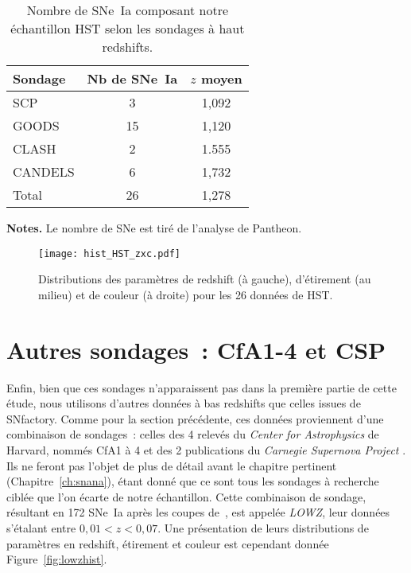 \documentclass[../main/main.tex]{subfiles}
\begin{document}
\begin{table}[]
    \centering
    \begin{threeparttable}
        \caption[Nombre de SNe~Ia de notre échantillon HST selon la
        source]{Nombre de SNe~Ia composant notre échantillon HST selon les
        sondages à haut redshifts.}
        \label{tab:hstcuts}
        \begin{tabular}{lcc}
            \toprule
            Sondage & Nb de SNe~Ia & $z$ moyen \\
            \midrule
            SCP     & 3            & 1,092 \\
            GOODS   & 15           & 1,120 \\
            CLASH   & 2            & 1.555 \\
            CANDELS & 6            & 1,732 \\
            \midrule
            Total   & 26           & 1,278 \\
            \bottomrule
        \end{tabular}
        \begin{tablenotes}[flushleft]
        \item\small \textbf{\hspace{-3,2pt}Notes.} Le nombre de SNe est tiré de
            l'analyse de Pantheon.
        \end{tablenotes}
    \end{threeparttable}
\end{table}

\begin{figure}[]
    \centering
    \texttt{[image: hist\_HST\_zxc.pdf]}
    \caption[Distributions des paramètres de redshift, étirement et couleur de
    HST]{Distributions des paramètres de redshift (à gauche), d'étirement (au
    milieu) et de couleur (à droite) pour les 26 données de HST.}
    \label{fig:hsthist}
\end{figure}

\section{Autres sondages~: CfA1-4 et CSP}\label{sec:lowz}

Enfin, bien que ces sondages n'apparaissent pas dans la première partie de cette
étude, nous utilisons d'autres données à bas redshifts que celles issues de
SNfactory. Comme pour la section précédente, ces données proviennent d'une
combinaison de sondages~: celles des 4 relevés du \textit{Center for
Astrophysics} de Harvard, nommés CfA1 à 4 \citep{riess1999, jha2006,
hicken2009a, hicken2009b, hicken2012} et des 2 publications du \textit{Carnegie
Supernova Project} \citep[CSP,][]{contreras2010, folatelli2010,
stritzinger2011}. Ils ne feront pas l'objet de plus de détail avant le chapitre
pertinent (Chapitre~\ref{ch:snana}), étant donné que ce sont tous les sondages à
recherche ciblée que l'on écarte de notre échantillon. Cette combinaison de
sondage, résultant en 172 SNe~Ia après les coupes de~\cite{scolnic2018}, est
appelée \textit{LOWZ}, leur données s'étalant entre $0,01 < z < 0,07$. Une
présentation de leurs distributions de paramètres en redshift, étirement et
couleur est cependant donnée Figure~\ref{fig:lowzhist}.
\end{document}
